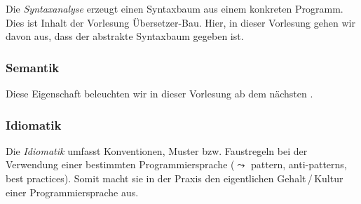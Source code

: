 Die \emph{Syntaxanalyse} erzeugt einen Syntaxbaum aus einem konkreten Programm. Dies ist Inhalt der Vorlesung Übersetzer-Bau. Hier, in dieser Vorlesung gehen wir davon aus, dass der abstrakte Syntaxbaum gegeben ist.



\subsubsection{Semantik}

Diese Eigenschaft beleuchten wir in dieser Vorlesung ab dem nächsten .



\subsubsection{Idiomatik}

Die \emph{Idiomatik} umfasst Konventionen, Muster bzw. Faustregeln bei der Verwendung einer bestimmten Programmiersprache ($\leadsto$ pattern, anti-patterns, best practices). Somit macht sie in der Praxis den eigentlichen Gehalt\,/\,Kultur einer Programmiersprache aus.
